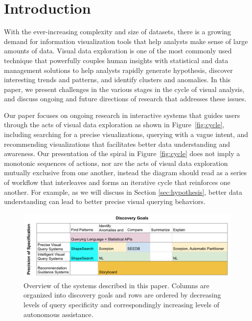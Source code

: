 \section{Introduction}%
\par With the ever-increasing complexity and size of datasets, there is a growing demand for information visualization tools that help analysts make sense of large amounts of data. Visual data exploration is one of the most commonly used technique that powerfully couples human insights with statistical and data management solutions to help analysts rapidly generate hypothesis, discover interesting trends and patterns, and identify clusters and anomalies. In this paper, we present challenges in the various stages in the cycle of visual analysis, and discuss ongoing and future directions of research that addresses these issues.
\par Our paper focuses on ongoing research in interactive systems that guides users through the acts of visual data exploration as shown in Figure~\ref{fig:cycle}, including searching for a precise visualizations, querying with a vague intent, and recommending visualizations that facilitates better data understanding and awareness. Our presentation of the spiral in Figure~\ref{fig:cycle} does not imply a monotonic sequences of actions, nor are the acts of visual data exploration mutually exclusive from one another, instead the diagram should read as a series of workflow that interleaves and forms an iterative cycle that reinforces one another. For example, as we will discuss in Section \ref{sec:hypothesis}, better data understanding can lead to better precise visual querying behaviors.
\begin{figure}[h!]
\label{fig:table}
\centering
\includegraphics[width=0.7\linewidth]{figures/table.png}
\caption{Overview of the systems described in this paper. Columns are organized into discovery goals and rows are ordered by decreasing levels of query specificity and correspondingly increasing levels of autonomous assistance.}
\end{figure}
